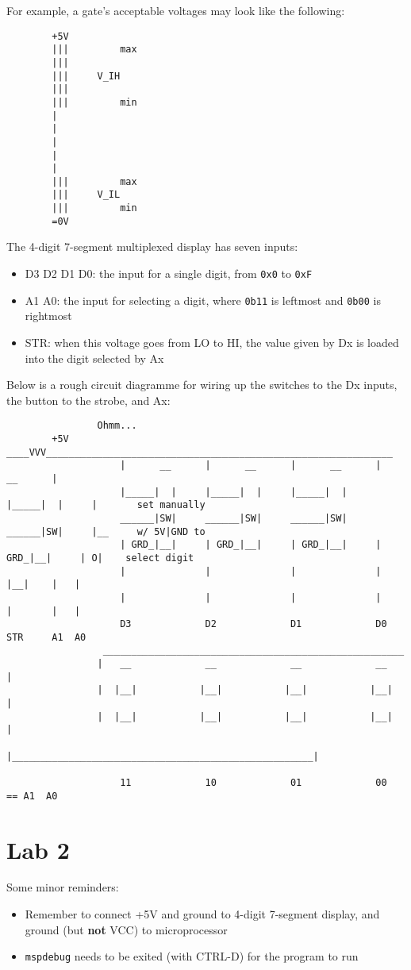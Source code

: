 \documentclass[11pt]{article}
\begin{document}
		For example, a gate's acceptable voltages may look like the following:
	\newpage
	\begin{verbatim}
		+5V
		|||         max
		|||
		|||     V_IH
		|||
		|||         min
		|
		|
		|
		|
		|
		|||         max
		|||     V_IL
		|||         min
		=0V
	\end{verbatim}
		The 4-digit 7-segment multiplexed display has seven inputs:
	\begin{itemize}
		\item D3 D2 D1 D0: the input for a single digit, from \texttt{0x0} to \texttt{0xF}
		\item  A1 A0:      the input for selecting a digit, where \texttt{0b11} is leftmost and \texttt{0b00} is rightmost
		\item STR:         when this voltage goes from LO to HI, the value given by Dx is loaded into the digit selected by Ax
	\end{itemize}
	Below is a rough circuit diagramme for wiring up the switches to the Dx inputs, the button to the strobe, and Ax:
	\begin{verbatim}
		        Ohmm...
		+5V ____VVV_____________________________________________________________
		            |      __      |      __      |      __      |      __      |
		            |_____|  |     |_____|  |     |_____|  |     |_____|  |     |       set manually
		            ______|SW|     ______|SW|     ______|SW|     ______|SW|     |__     w/ 5V|GND to
		            | GRD_|__|     | GRD_|__|     | GRD_|__|     | GRD_|__|     | O|    select digit
		            |              |              |              |              |__|    |   |
		            |              |              |              |              |       |   |
		            D3             D2             D1             D0             STR     A1  A0
		         _____________________________________________________
		        |   __             __             __             __   |
		        |  |__|           |__|           |__|           |__|  |
		        |  |__|           |__|           |__|           |__|  |
		        |_____________________________________________________|
		
		            11             10             01             00                  == A1  A0
	\end{verbatim}
	
	\newpage
	\section{Lab 2}
		Some minor reminders:
	\begin{itemize}
		\item Remember to connect +5V and ground to 4-digit 7-segment display, and ground (but \textbf{not} VCC) to microprocessor
		\item \texttt{mspdebug} needs to be exited (with CTRL-D) for the program to run
	\end{itemize}
\end{document}
